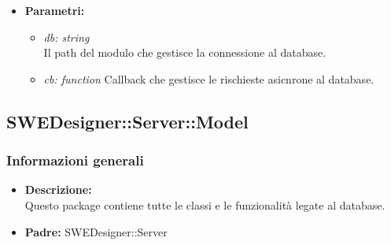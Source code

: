 \begin{itemize}
\begin{itemize}
            \item \textbf{Parametri:}\\
            \begin{itemize}
              \item \emph{db: string}\\
              Il path del modulo che gestisce la connessione al database.
              \item \emph{cb: function}
              Callback che gestisce le rischieste asicnrone al database.
            \end{itemize}
          \end{itemize}
        \end{itemize}
  \subsection{SWEDesigner::Server::Model}
    \subsubsection{Informazioni generali}
      \begin{itemize}
        \item \textbf{Descrizione:}\\
        Questo package contiene tutte le classi e le funzionalità legate al database.
        \item \textbf{Padre: }SWEDesigner::Server
      \end{itemize}
